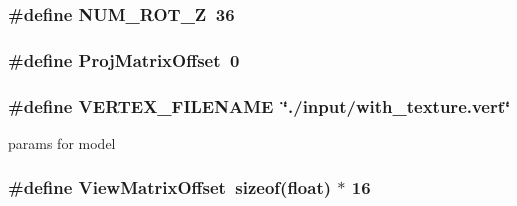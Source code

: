 \hypertarget{model_8cu_a58b414f04d228b95891ea4dd40cf9ccc}{
\subsubsection[{N\-U\-M\-\_\-\-R\-O\-T\-\_\-\-Z}]{\setlength{\rightskip}{0pt plus 5cm}\#define N\-U\-M\-\_\-\-R\-O\-T\-\_\-\-Z~36}}\label{model_8cu_a58b414f04d228b95891ea4dd40cf9ccc}
\hypertarget{model_8cu_a8d10f38fead171e48c91cf41b2bdb829}{
\subsubsection[{Proj\-Matrix\-Offset}]{\setlength{\rightskip}{0pt plus 5cm}\#define Proj\-Matrix\-Offset~0}}\label{model_8cu_a8d10f38fead171e48c91cf41b2bdb829}
\hypertarget{model_8cu_a419f5a78dee2d2497fb46b8efe42876f}{
\subsubsection[{V\-E\-R\-T\-E\-X\-\_\-\-F\-I\-L\-E\-N\-A\-M\-E}]{\setlength{\rightskip}{0pt plus 5cm}\#define V\-E\-R\-T\-E\-X\-\_\-\-F\-I\-L\-E\-N\-A\-M\-E~\char`\"{}./input/with\-\_\-texture.\-vert\char`\"{}}}\label{model_8cu_a419f5a78dee2d2497fb46b8efe42876f}


params for model 

\hypertarget{model_8cu_a2eff906dbc2a93745aca1c31a24ec41d}{
\subsubsection[{View\-Matrix\-Offset}]{\setlength{\rightskip}{0pt plus 5cm}\#define View\-Matrix\-Offset~sizeof(float) $\ast$ 16}}\label{model_8cu_a2eff906dbc2a93745aca1c31a24ec41d}


